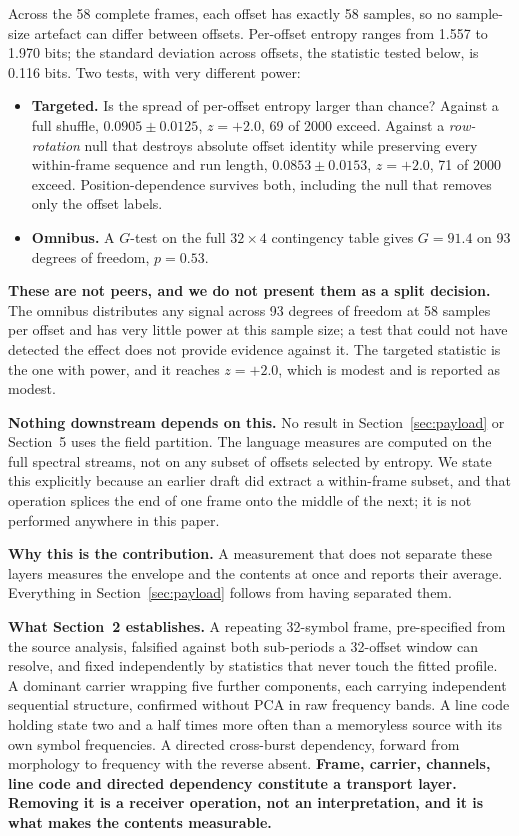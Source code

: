 \documentclass[11pt,a4paper]{article}
\begin{document}
Across the 58 complete frames, each offset has exactly 58 samples, so no sample-size
artefact can differ between offsets. Per-offset entropy ranges from 1.557 to 1.970 bits; the
standard deviation across offsets, the statistic tested below, is 0.116 bits. Two tests, with very different power:

\begin{itemize}[leftmargin=1.3em,itemsep=2pt]
\item \textbf{Targeted.} Is the spread of per-offset entropy larger than chance? Against
a full shuffle, $0.0905 \pm 0.0125$, $z = +2.0$, 69 of 2000 exceed. Against a
\emph{row-rotation} null that destroys absolute offset identity while preserving every
within-frame sequence and run length, $0.0853 \pm 0.0153$, $z = +2.0$, 71 of 2000 exceed.
Position-dependence survives both, including the null that removes only the offset labels.
\item \textbf{Omnibus.} A $G$-test on the full $32 \times 4$ contingency table gives
$G = 91.4$ on 93 degrees of freedom, $p = 0.53$.
\end{itemize}

\textbf{These are not peers, and we do not present them as a split decision.} The omnibus
distributes any signal across 93 degrees of freedom at 58 samples per offset and has very
little power at this sample size; a test that could not have detected the effect does not
provide evidence against it. The targeted statistic is the one with power, and it reaches
$z = +2.0$, which is modest and is reported as modest.

\textbf{Nothing downstream depends on this.} No result in
Section~\ref{sec:payload} or Section~5 uses the field partition. The language measures are
computed on the full spectral streams, not on any subset of offsets selected by entropy.
We state this explicitly because an earlier draft did extract a within-frame subset, and
that operation splices the end of one frame onto the middle of the next; it is not
performed anywhere in this paper.

\medskip
\noindent
\textbf{Why this is the contribution.} A measurement that does not separate these layers
measures the envelope and the contents at once and reports their average. Everything in
Section~\ref{sec:payload} follows from having separated them.

\medskip
\noindent
\textbf{What Section~2 establishes.} A repeating 32-symbol frame, pre-specified from
the source analysis, falsified against both sub-periods a 32-offset window can resolve,
and fixed independently by statistics that never touch the fitted profile. A
dominant carrier wrapping five further components, each carrying independent sequential
structure, confirmed without PCA in raw frequency bands. A line code holding state two
and a half times more often than a memoryless source with its own symbol frequencies.
A directed cross-burst dependency, forward
from morphology to frequency with the reverse absent. \textbf{Frame, carrier, channels,
line code and directed dependency constitute a transport layer. Removing it is a
receiver operation, not an interpretation, and it is what makes the contents
measurable.}
\end{document}
